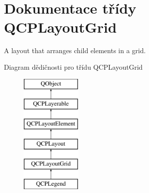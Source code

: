\hypertarget{classQCPLayoutGrid}{}\section{Dokumentace třídy Q\+C\+P\+Layout\+Grid}
\label{classQCPLayoutGrid}


A layout that arranges child elements in a grid.  


Diagram dědičnosti pro třídu Q\+C\+P\+Layout\+Grid\begin{figure}[H]
\begin{center}
\leavevmode
\includegraphics[height=6.000000cm]{classQCPLayoutGrid}
\end{center}
\end{figure}
